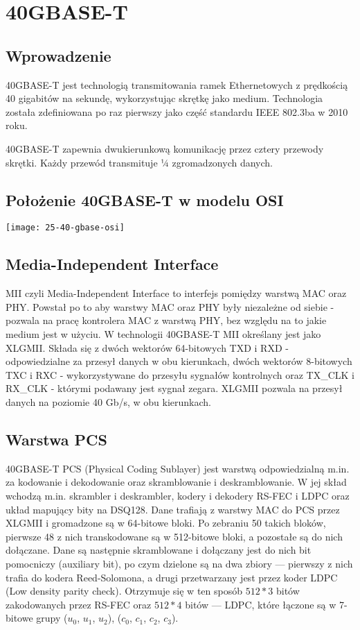 \section{40GBASE-T}

\subsection{Wprowadzenie}
40GBASE-T jest technologią transmitowania ramek Ethernetowych z prędkością 40 gigabitów na sekundę, wykorzystując skrętkę jako medium. Technologia została zdefiniowana po raz pierwszy jako część standardu IEEE 802.3ba w 2010 roku.

40GBASE-T zapewnia dwukierunkową komunikację przez cztery przewody skrętki. Każdy przewód transmituje ¼ zgromadzonych danych.

\subsection{Położenie 40GBASE-T w modelu OSI}
\texttt{[image: 25-40-gbase-osi]}

\subsection{Media-Independent Interface}
MII czyli Media-Independent Interface to interfejs pomiędzy warstwą MAC oraz PHY. Powstał po to aby warstwy MAC oraz PHY były niezależne od siebie - pozwala na pracę kontrolera MAC z warstwą PHY, bez względu na to jakie medium jest w użyciu.
W technologii 40GBASE-T MII określany jest jako XLGMII. Składa się z dwóch wektorów 64-bitowych TXD i RXD - odpowiedzialne za przesył danych w obu kierunkach, dwóch wektorów 8-bitowych TXC i RXC - wykorzystywane do przesyłu sygnałów kontrolnych oraz TX\_CLK i RX\_CLK - którymi podawany jest sygnał zegara. XLGMII pozwala na przesył danych na poziomie 40 Gb/s, w obu kierunkach.

\subsection{Warstwa PCS}\label{subsection:pcs}
40GBASE-T PCS (Physical Coding Sublayer) jest warstwą odpowiedzialną m.in. za kodowanie i dekodowanie oraz skramblowanie i deskramblowanie. W jej skład wchodzą m.in. skrambler i deskrambler, kodery i dekodery RS-FEC i LDPC oraz układ mapujący bity na DSQ128.
Dane trafiają z warstwy MAC do PCS przez XLGMII i gromadzone są w 64-bitowe bloki. Po zebraniu 50 takich bloków, pierwsze 48 z nich transkodowane są w 512-bitowe bloki, a pozostałe są do nich dołączane. Dane są następnie skramblowane i dołączany jest do nich bit pomocniczy (auxiliary bit), po czym dzielone są na dwa zbiory --- pierwszy z nich trafia do kodera Reed-Solomona, a drugi przetwarzany jest przez koder LDPC (Low density parity check). Otrzymuje się w ten sposób $512*3$ bitów zakodowanych przez RS-FEC oraz $512*4$ bitów --- LDPC, które łączone są w 7-bitowe grupy  ($u_0$, $u_1$, $u_2$), ($c_0$, $c_1$, $c_2$, $c_3$).

